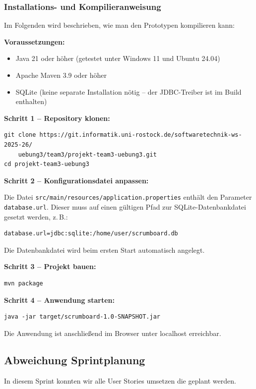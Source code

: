 \documentclass[a4paper,11pt]{article}
\begin{document}
\subsubsection*{Installations- und Kompilieranweisung}

Im Folgenden wird beschrieben, wie man den Prototypen kompilieren kann:

\textbf{Voraussetzungen:}
\begin{itemize}
    \item Java 21 oder höher (getestet unter Windows 11 und Ubuntu 24.04)
    \item Apache Maven 3.9 oder höher
    \item SQLite (keine separate Installation nötig -- der JDBC-Treiber ist im Build enthalten)
\end{itemize}

\textbf{Schritt 1 -- Repository klonen:}
\begin{verbatim}
git clone https://git.informatik.uni-rostock.de/softwaretechnik-ws-2025-26/
    uebung3/team3/projekt-team3-uebung3.git
cd projekt-team3-uebung3
\end{verbatim}

\textbf{Schritt 2 -- Konfigurationsdatei anpassen:}

Die Datei \texttt{src/main/resources/application.properties} enthält den Parameter \texttt{database.url}.
Dieser muss auf einen gültigen Pfad zur SQLite-Datenbankdatei gesetzt werden, z.\,B.:
\begin{verbatim}
database.url=jdbc:sqlite:/home/user/scrumboard.db
\end{verbatim}
Die Datenbankdatei wird beim ersten Start automatisch angelegt.

\textbf{Schritt 3 -- Projekt bauen:}
\begin{verbatim}
mvn package
\end{verbatim}

\textbf{Schritt 4 -- Anwendung starten:}
\begin{verbatim}
java -jar target/scrumboard-1.0-SNAPSHOT.jar
\end{verbatim}

Die Anwendung ist anschließend im Browser unter localhost erreichbar.

\subsection{Abweichung Sprintplanung}
In diesem Sprint konnten wir alle User Stories umsetzen die geplant werden.  
\end{document}
